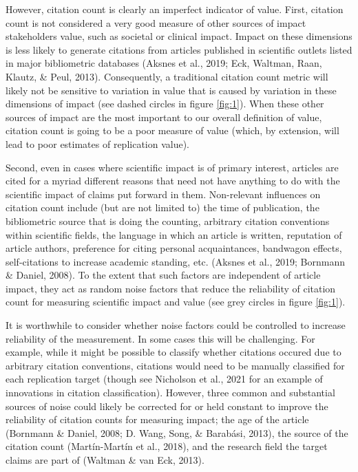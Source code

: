 \documentclass[
  english,
  jou,floatsintext]{apa6}
\begin{document}
However, citation count is clearly an imperfect indicator of value. First, citation count is not considered a very good measure of other sources of impact stakeholders value, such as societal or clinical impact. Impact on these dimensions is less likely to generate citations from articles published in scientific outlets listed in major bibliometric databases (Aksnes et al., 2019; Eck, Waltman, Raan, Klautz, \& Peul, 2013). Consequently, a traditional citation count metric will likely not be sensitive to variation in value that is caused by variation in these dimensions of impact (see dashed circles in figure \ref{fig:1}). When these other sources of impact are the most important to our overall definition of value, citation count is going to be a poor measure of value (which, by extension, will lead to poor estimates of replication value).

Second, even in cases where scientific impact is of primary interest, articles are cited for a myriad different reasons that need not have anything to do with the scientific impact of claims put forward in them. Non-relevant influences on citation count include (but are not limited to) the time of publication, the bibliometric source that is doing the counting, arbitrary citation conventions within scientific fields, the language in which an article is written, reputation of article authors, preference for citing personal acquaintances, bandwagon effects, self-citations to increase academic standing, etc. (Aksnes et al., 2019; Bornmann \& Daniel, 2008). To the extent that such factors are independent of article impact, they act as random noise factors that reduce the reliability of citation count for measuring scientific impact and value (see grey circles in figure \ref{fig:1}).

It is worthwhile to consider whether noise factors could be controlled to increase reliability of the measurement. In some cases this will be challenging. For example, while it might be possible to classify whether citations occured due to arbitrary citation conventions, citations would need to be manually classified for each replication target (though see Nicholson et al., 2021 for an example of innovations in citation classification). However, three common and substantial sources of noise could likely be corrected for or held constant to improve the reliability of citation counts for measuring impact; the age of the article (Bornmann \& Daniel, 2008; D. Wang, Song, \& Barabási, 2013), the source of the citation count (Martín-Martín et al., 2018), and the research field the target claims are part of (Waltman \& van Eck, 2013).
\end{document}
